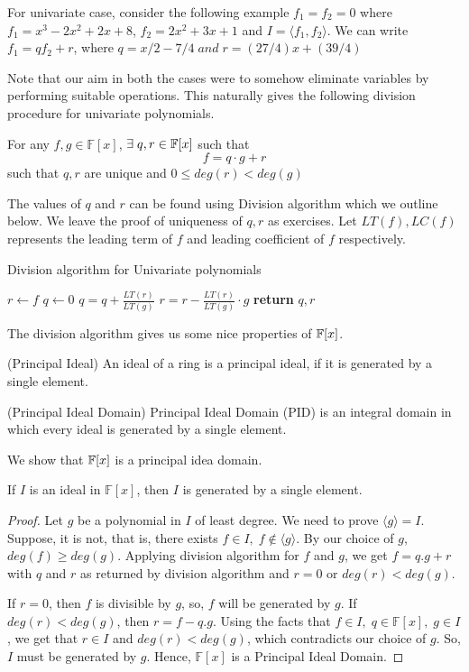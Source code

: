 \begin{example}
For univariate case, consider the following example $f_1 = f_2 = 0$ where
$f_1 = x^3-2x^2+2x+8$, $f_2 = 2x^2+3x+1$ and $I=\langle f_1,f_2\rangle $. 
We can write $f_1 = qf_2+r$, where $q=x/2 - 7/4\;and \; r=(27/4)x+(39/4)$
\end{example}
Note that our aim in both the cases were to somehow eliminate variables by
performing suitable operations. This naturally gives the following division
procedure for univariate polynomials.

\begin{lemma}[Division]
	For any $f,g \in \mathbb{F}[x]$, $\exists\;q,r \in {\mathbb{F}}[x]$ such 
	that $$ f=q \cdot g+r $$ such that $q,r$ are unique and 
	$0 \le deg(r) < deg(g)$
\end{lemma}
The values of $q$ and $r$ can be found using Division algorithm which we
outline below. We leave the proof of uniqueness of $q,r$ as exercises.
Let $LT(f),LC(f)$ represents the leading term of $f$ and leading coefficient 
of $f$ respectively. 
\begin{algorithm}[htp!]
\caption{Division algorithm for Univariate polynomials}\label{euclid}
\begin{algorithmic}[1]
\State $r \leftarrow f$
\State $q \leftarrow 0$
\State $q = q + \frac{LT(r)}{LT(g)}$
\State $r=r-\frac{LT(r)}{LT(g)}\cdot g$
\EndWhile
\State \textbf{return} $q,r$
\EndProcedure
\end{algorithmic}
\end{algorithm}
The division algorithm gives us some nice properties of ${\mathbb{F}}[x]$. 

\begin{definition}(Principal Ideal)
An ideal of a ring is a principal ideal, if it is generated by a single element.
\end{definition}
\begin{definition}(Principal Ideal Domain)
Principal Ideal Domain (PID) is an integral domain in which every ideal is generated by a single element.
\end{definition}
We show that ${\mathbb{F}}[x]$ is a principal idea domain.
\begin{theorem} \label{thm:pid-univariate}
If $I$ is an ideal in $\mathbb{F}[x]$, then $I$ is generated by a single element. 
\end{theorem}
\begin{proof} 
	Let $g$ be a polynomial in $I$ of least degree. We need to prove
	$\langle g\rangle =I$. Suppose, it is not, that is, there exists $f \in
	I,\; f \notin \langle g\rangle$.  By our choice  of $g$,
	$deg(f)\geq deg(g)$. Applying division algorithm for $f$ and $g$, we
	get $f=q.g+r$ with $q$ and $r$ as returned by division algorithm 
	and $r=0$ or $deg(r)<deg(g)$.
	
	If $r=0$, then $f$ is divisible by $g$, so, $f$ will be generated by
	$g$. If $deg(r)<deg(g)$, then $r = f-q.g$. Using the facts that $ f\in
	I,\;q\in\mathbb{F}[x],\;g\in I$, we get that $r\in I$ and
	$deg(r)<deg(g)$, which contradicts our choice of $g$. So, $I$ must
	be generated by $g$. Hence, $\mathbb{F}[x]$ is a Principal Ideal Domain.
\end{proof}

